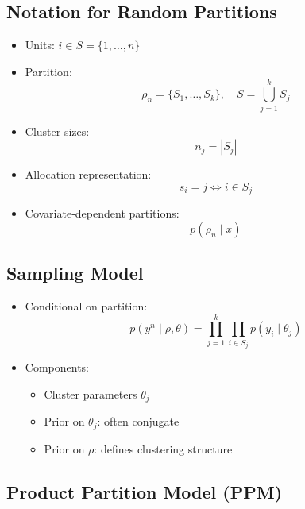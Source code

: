 \documentclass[12pt,oneside]{book}
\numberwithin{equation}{section}
\theoremstyle{definition}
\theoremstyle{plain}
\theoremstyle{remark}
\begin{document}
\subsection*{Notation for Random Partitions}

\begin{itemize}
\item Units: $i \in S = \{1,\dots,n\}$

\item Partition:
\[
\rho_n = \{S_1,\dots,S_k\}, \quad S = \bigcup_{j=1}^k S_j
\]

\item Cluster sizes:
\[
n_j = |S_j|
\]

\item Allocation representation:
\[
s_i = j \iff i \in S_j
\]

\item Covariate-dependent partitions:
\[
p(\rho_n \mid x)
\]
\end{itemize}

\subsection{Sampling Model}

\begin{itemize}
\item Conditional on partition:
\[
p(y^n \mid \rho, \theta)
=
\prod_{j=1}^k \prod_{i \in S_j} p(y_i \mid \theta_j)
\]

\item Components:
\begin{itemize}
\item Cluster parameters $\theta_j$
\item Prior on $\theta_j$: often conjugate
\item Prior on $\rho$: defines clustering structure
\end{itemize}
\end{itemize}

\subsection{Product Partition Model (PPM)}
\end{document}
